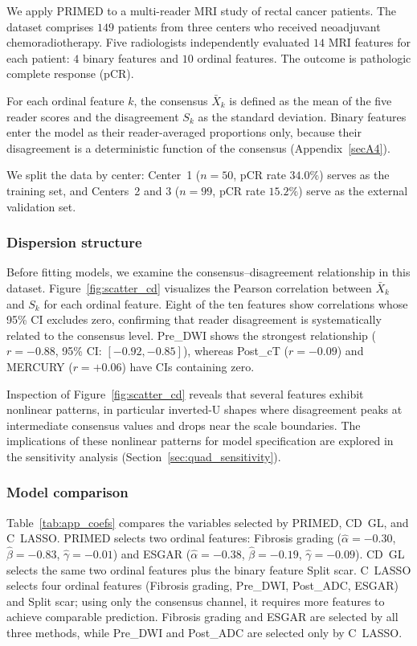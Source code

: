 \documentclass[referee,lineno,pdflatex,sn-vancouver-num]{sn-jnl}
\begin{document}
We apply PRIMED to a multi-reader MRI study of rectal cancer patients.
The dataset comprises $149$ patients from three centers who received neoadjuvant chemoradiotherapy.
Five radiologists independently evaluated $14$ MRI features for each patient: $4$ binary features and $10$ ordinal features.
The outcome is pathologic complete response (pCR).

For each ordinal feature $k$, the consensus $\bar X_k$ is defined as the mean of the five reader scores and the disagreement $S_k$ as the standard deviation.
Binary features enter the model as their reader-averaged proportions only, because their disagreement is a deterministic function of the consensus (Appendix~\ref{secA4}).

We split the data by center: Center~1 ($n = 50$, pCR rate $34.0\%$) serves as the training set, and Centers~2 and 3 ($n = 99$, pCR rate $15.2\%$) serve as the external validation set.

\subsubsection{Dispersion structure}

Before fitting models, we examine the consensus--disagreement relationship in this dataset.
Figure~\ref{fig:scatter_cd} visualizes the Pearson correlation between $\bar X_k$ and $S_k$ for each ordinal feature.
Eight of the ten features show correlations whose 95\% CI excludes zero, confirming that reader disagreement is systematically related to the consensus level.
Pre\_DWI shows the strongest relationship ($r = -0.88$, 95\% CI: $[-0.92, -0.85]$), whereas Post\_cT ($r = -0.09$) and MERCURY ($r = +0.06$) have CIs containing zero.

Inspection of Figure~\ref{fig:scatter_cd} reveals that several features exhibit nonlinear patterns, in particular inverted-U shapes where disagreement peaks at intermediate consensus values and drops near the scale boundaries.
The implications of these nonlinear patterns for model specification are explored in the sensitivity analysis (Section~\ref{sec:quad_sensitivity}).

\subsubsection{Model comparison}

Table~\ref{tab:app_coefs} compares the variables selected by PRIMED, CD~GL, and C~LASSO.
PRIMED selects two ordinal features: Fibrosis grading ($\hat\alpha = -0.30$, $\hat\beta = -0.83$, $\hat\gamma = -0.01$) and ESGAR ($\hat\alpha = -0.38$, $\hat\beta = -0.19$, $\hat\gamma = -0.09$).
CD~GL selects the same two ordinal features plus the binary feature Split scar.
C~LASSO selects four ordinal features (Fibrosis grading, Pre\_DWI, Post\_ADC, ESGAR) and Split scar; using only the consensus channel, it requires more features to achieve comparable prediction.
Fibrosis grading and ESGAR are selected by all three methods, while Pre\_DWI and Post\_ADC are selected only by C~LASSO.
\end{document}

